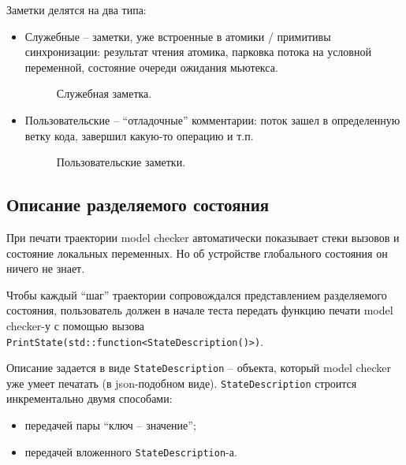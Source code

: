 Заметки делятся на два типа:

\begin{itemize}
\item	Служебные – заметки, уже встроенные в атомики / примитивы синхронизации: результат чтения атомика, парковка потока на условной переменной, состояние очереди ожидания мьютекса. 

\begin{figure}
	\bigskip
	\caption{Служебная заметка.}
\end{figure}

\item	Пользовательские – “отладочные” комментарии: поток зашел в определенную ветку кода, завершил какую-то операцию и т.п.

\begin{figure}
	\bigskip
	\caption{Пользовательские заметки.}
\end{figure}

\end{itemize}

\subsection{Описание разделяемого состояния}

При печати траектории model checker автоматически показывает стеки вызовов и состояние локальных переменных. Но об устройстве глобального состояния он ничего не знает.

Чтобы каждый “шаг” траектории сопровождался представлением разделяемого состояния, пользователь должен в начале теста передать функцию печати model checker-у с помощью вызова \texttt{PrintState(std::function<StateDescription()>)}.

Описание задается в виде \texttt{StateDescription} – объекта, который model checker уже умеет печатать (в json-подобном виде). \texttt{StateDescription} строится инкрементально двумя способами:

\begin{itemize}
\item	передачей пары “ключ – значение”;

\item	передачей вложенного \texttt{StateDescription}-а.
\end{itemize}


